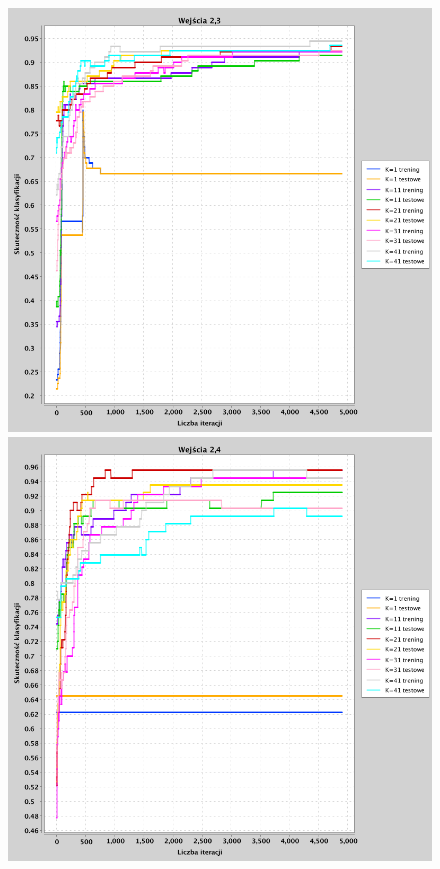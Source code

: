 \documentclass[a4paper, portrait,11pt]{article}
\begin{document}
\begin{figure}[!htb]
  \begin{minipage}{0.33\textwidth}
    \centering
    \includegraphics[width=1\linewidth]{../data/classification4/1/2_2,3.png}
    \caption{\label{fig:41_2_2,3}}
  \end{minipage}
  \begin{minipage}{0.33\textwidth}
    \centering
    \includegraphics[width=1\linewidth]{../data/classification4/1/2_2,4.png}

\end{minipage}
\end{figure}
\end{document}
